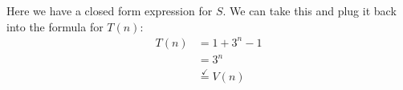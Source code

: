 \documentclass[12pt]{exam}
\begin{document}
\begin{questions}
{\begin{minipage}[t]{14.55cm}
			\begin{center}
				Here we have a closed form expression for $S$. We can take this and plug it back into the formula for $T(n)$:
				\begin{align*}
					T(n) &= 1 + 3^{n} - 1 \\
					&= 3^{n} \\
					&\stackrel{\checkmark}{=} V(n)
				\end{align*}
			\end{center}
			
		\vspace{25pt}
	\end{minipage}
}
	
	
	
	
	
	
	
	
	
	
	
	
	
		
	
\end{questions}
		
\end{document}

